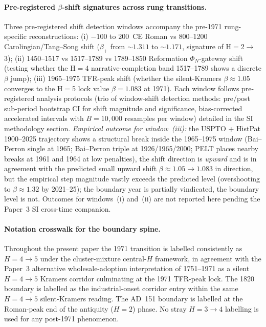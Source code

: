 \paragraph{Pre-registered $\beta$-shift signatures across rung transitions.} Three pre-registered shift detection windows accompany the pre-1971 rung-specific reconstructions: (i) $-100$ to $200$~CE Roman vs 800--1200 Carolingian/Tang--Song shift ($\beta_+$ from $\sim 1.311$ to $\sim 1.171$, signature of H${=}$2$\to$3); (ii) 1450--1517 vs 1517--1789 vs 1789--1850 Reformation $\Phi_N$-gateway shift (testing whether the H${=}$4 narrative-completion band 1517--1789 shows a discrete $\beta$ jump); (iii) 1965--1975 TFR-peak shift (whether the silent-Kramers $\beta\approx 1.05$ converges to the H${=}$5 lock value $\beta=1.083$ at 1971). Each window follows pre-registered analysis protocols (trio of window-shift detection methods: pre/post sub-period bootstrap CI for shift magnitude and significance, bias-corrected accelerated intervals with $B=10{,}000$ resamples per window) detailed in the SI methodology section. \emph{Empirical outcome for window~(iii):} the USPTO + HistPat 1900--2025 trajectory shows a structural break inside the 1965--1975 window (Bai--Perron single at 1965; Bai--Perron triple at 1926/1965/2000; PELT places nearby breaks at 1961 and 1964 at low penalties), the shift direction is \emph{upward} and is in agreement with the predicted small upward shift $\beta\!\approx\!1.05\!\to\!1.083$ in direction, but the empirical step magnitude vastly exceeds the predicted level (overshooting to $\beta\!\approx\!1.32$ by 2021--25); the boundary year is partially vindicated, the boundary level is not. Outcomes for windows~(i) and~(ii) are not reported here pending the Paper~3 SI cross-time companion.

\paragraph{Notation crosswalk for the boundary spine.}
Throughout the present paper the 1971 transition is labelled consistently as \(H=4\to5\) under the cluster-mixture central-\(H\) framework, in agreement with the Paper~3 alternative wholesale-adoption interpretation of 1751--1971 as a silent \(H=4\to5\) Kramers corridor culminating at the 1971 TFR-peak lock. The 1820 boundary is labelled as the industrial-onset corridor entry within the same \(H=4\to5\) silent-Kramers reading. The AD~151 boundary is labelled at the Roman-peak end of the antiquity (\(H=2\)) phase. No stray \(H=3\to4\) labelling is used for any post-1971 phenomenon.

